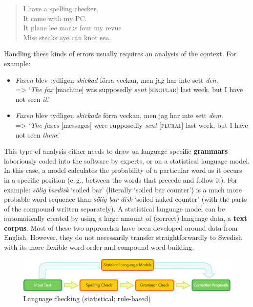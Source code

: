 \begin{multicols}{2}
\begin{quote}
  I have a spelling checker,\\
  It came with my PC.\\ 
  It plane lee marks four my revue\\
  Miss steaks aye can knot sea.
\end{quote}

Handling these kinds of errors usually requires an analysis of the context. For example: 

\begin{itemize}[itemsep=0pt,parsep=0pt]
\item \textit{Faxen} blev tydligen \textit{skickad} förra veckan, men jag har inte sett \textit{den}.\\
=> ‘\emph{The fax} [machine] was supposedly \emph{sent} [\textsc{singular}] last week, but I have not seen \emph{it}.’
\item \textit{Faxen} blev tydligen \textit{skickade} förra veckan, men jag har inte sett \textit{dem}.\\
=> ‘\emph{The faxes} [messages] were supposedly \emph{sent} [\textsc{plural}] last week, but I have not seen \emph{them}.’
\end{itemize}

This type of analysis either needs to draw on language-specific
\textbf{grammars} laboriously coded into the software by experts, or
on a statistical language model. In this case, a model calculates the
probability of a particular word as it occurs in a specific position
(e.\,g., between the words that precede and follow it). For example:
\textit{sölig bardisk} `soiled bar' (literally `soiled bar counter')
is a much more probable word sequence than \textit{sölig bar disk}
`soiled naked counter' (with the parts of the compound written
separately). A statistical language model can be automatically created
by using a large amount of (correct) language data, a \textbf{text
  corpus}. Most of these two approaches have been developed around
data from English. However, they do not necessarily transfer
straightforwardly to Swedish with its more flexible word order and
compound word building.

\begin{figure}[htb]
  \center
  \includegraphics[width=\textwidth]{../_media/english/language_checking}
  \caption{Language checking (statistical; rule-based)}
  \label{fig:langcheckingaarch_en}
\end{figure}


\end{multicols}
